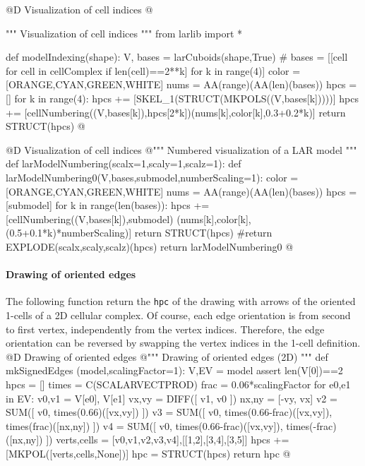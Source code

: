 \documentclass[11pt,oneside]{article}    %
\begin{document}
@D Visualization of cell indices
@{""" Visualization of cell indices """
from larlib import *

def modelIndexing(shape):
    V, bases = larCuboids(shape,True)
    # bases = [[cell for cell in cellComplex if len(cell)==2**k] for k in range(4)]
    color = [ORANGE,CYAN,GREEN,WHITE]
    nums = AA(range)(AA(len)(bases))
    hpcs = []
    for k in range(4):
        hpcs += [SKEL_1(STRUCT(MKPOLS((V,bases[k]))))]
        hpcs += [cellNumbering((V,bases[k]),hpcs[2*k])(nums[k],color[k],0.3+0.2*k)]
    return STRUCT(hpcs)
@}


@D Visualization of cell indices
@{""" Numbered visualization of a LAR model """
def larModelNumbering(scalx=1,scaly=1,scalz=1):
    def  larModelNumbering0(V,bases,submodel,numberScaling=1):
        color = [ORANGE,CYAN,GREEN,WHITE]
        nums = AA(range)(AA(len)(bases))
        hpcs = [submodel]
        for k in range(len(bases)):
            hpcs += [cellNumbering((V,bases[k]),submodel)
                        (nums[k],color[k],(0.5+0.1*k)*numberScaling)]
        return STRUCT(hpcs)
        #return EXPLODE(scalx,scaly,scalz)(hpcs)
    return larModelNumbering0
@}



\paragraph{Drawing of oriented edges}
The following function return the \texttt{hpc} of the drawing with arrows of the oriented 1-cells of a 2D cellular complex. Of course, each edge orientation is from second to first vertex, independently from the vertex indices. Therefore, the edge orientation can be reversed by swapping the vertex indices in the 1-cell definition. 
@D Drawing of oriented edges
@{""" Drawing of oriented edges (2D) """
def mkSignedEdges (model,scalingFactor=1):
    V,EV = model
    assert len(V[0])==2
    hpcs = []
    times = C(SCALARVECTPROD)
    frac = 0.06*scalingFactor
    for e0,e1 in EV:
        v0,v1 = V[e0], V[e1]
        vx,vy = DIFF([ v1, v0 ])
        nx,ny = [-vy, vx]
        v2 = SUM([ v0, times(0.66)([vx,vy]) ])
        v3 = SUM([ v0, times(0.66-frac)([vx,vy]), times(frac)([nx,ny]) ])
        v4 = SUM([ v0, times(0.66-frac)([vx,vy]), times(-frac)([nx,ny]) ])
        verts,cells = [v0,v1,v2,v3,v4],[[1,2],[3,4],[3,5]]
        hpcs += [MKPOL([verts,cells,None])]
    hpc = STRUCT(hpcs)
    return hpc
@}
\end{document}
